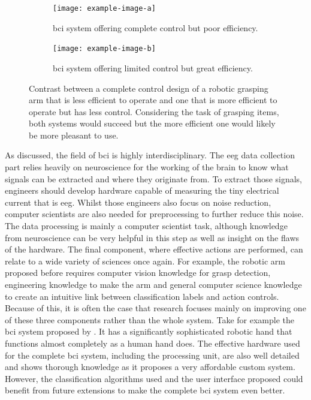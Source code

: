 \begin{figure}[ht]
  \begin{minipage}{\textwidth}
    \centering
    \begin{subfigure}{.48\textwidth}
        \centering
        \texttt{[image: example-image-a]}
        \captionsetup{width=0.9\linewidth}
        \captionsetup{justification=centering}
        \caption{\gls{bci} system offering complete control but poor efficiency.}
        \label{fig:example_arm_control_bad}
    \end{subfigure}
    \hfill
    \begin{subfigure}{.48\textwidth}
        \centering
        \texttt{[image: example-image-b]}
        \captionsetup{width=0.9\linewidth}
        \captionsetup{justification=centering}
        \caption{\gls{bci} system offering limited control but great efficiency.}
        \label{fig:example_arm_control_good}
    \end{subfigure}
    \captionsetup{width=0.9\linewidth}
    \captionsetup{justification=centering}
    \caption{Contrast between a complete control design of a robotic grasping arm that is less efficient to operate and one that is more efficient to operate but has less control. Considering the task of grasping items, both systems would succeed but the more efficient one would likely be more pleasant to use.}
    \label{fig:example_arm_control}
  \end{minipage}  
\end{figure}

As discussed, the field of \gls{bci} is highly interdisciplinary.
The \gls{eeg} data collection part relies heavily on neuroscience for the working of the brain to know what signals can be extracted and where they originate from.
To extract those signals, engineers should develop hardware capable of measuring the tiny electrical current that is \gls{eeg}.
Whilst those engineers also focus on noise reduction, computer scientists are also needed for preprocessing to further reduce this noise.
The data processing is mainly a computer scientist task, although knowledge from neuroscience can be very helpful in this step as well as insight on the flaws of the hardware.
The final component, where effective actions are performed, can relate to a wide variety of sciences once again.
For example, the robotic arm proposed before requires computer vision knowledge for grasp detection, engineering knowledge to make the arm and general computer science knowledge to create an intuitive link between classification labels and action controls.
Because of this, it is often the case that research focuses mainly on improving one of these three components rather than the whole system.
Take for example the \gls{bci} system proposed by \citet{complex_hand_few_classes}.
It has a significantly sophisticated robotic hand that functions almost completely as a human hand does.
The effective hardware used for the complete \gls{bci} system, including the processing unit, are also well detailed and shows thorough knowledge as it proposes a very affordable custom system.
However, the classification algorithms used and the user interface proposed could benefit from future extensions to make the complete \gls{bci} system even better.

